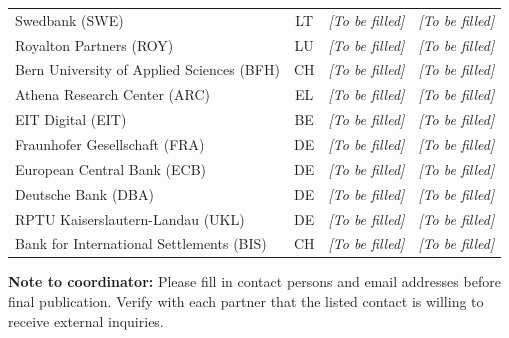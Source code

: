 \begin{small}
\begin{longtable}{p{5.8cm} c p{3.6cm} p{3.6cm}}
Swedbank (SWE)
  & LT & \emph{[To be filled]} & \emph{[To be filled]} \\
Royalton Partners (ROY)
  & LU & \emph{[To be filled]} & \emph{[To be filled]} \\
Bern University of Applied Sciences (BFH)
  & CH & \emph{[To be filled]} & \emph{[To be filled]} \\
Athena Research Center (ARC)
  & EL & \emph{[To be filled]} & \emph{[To be filled]} \\
EIT Digital (EIT)
  & BE & \emph{[To be filled]} & \emph{[To be filled]} \\
Fraunhofer Gesellschaft (FRA)
  & DE & \emph{[To be filled]} & \emph{[To be filled]} \\
European Central Bank (ECB)
  & DE & \emph{[To be filled]} & \emph{[To be filled]} \\
Deutsche Bank (DBA)
  & DE & \emph{[To be filled]} & \emph{[To be filled]} \\
RPTU Kaiserslautern-Landau (UKL)
  & DE & \emph{[To be filled]} & \emph{[To be filled]} \\
Bank for International Settlements (BIS)
  & CH & \emph{[To be filled]} & \emph{[To be filled]} \\
\end{longtable}
\end{small}

\begin{highlightbox}
\textbf{Note to coordinator:} Please fill in contact persons and email
addresses before final publication.  Verify with each partner that the listed
contact is willing to receive external inquiries.
\end{highlightbox}
